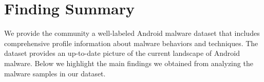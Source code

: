\section{Finding Summary}
\label{sec:value}

We provide the community a well-labeled Android malware dataset
that includes comprehensive profile information about malware behaviors
and techniques. The dataset provides an up-to-date picture of
the current landscape of Android malware. 
Below we highlight the main findings we obtained from analyzing the
malware samples in our dataset.

